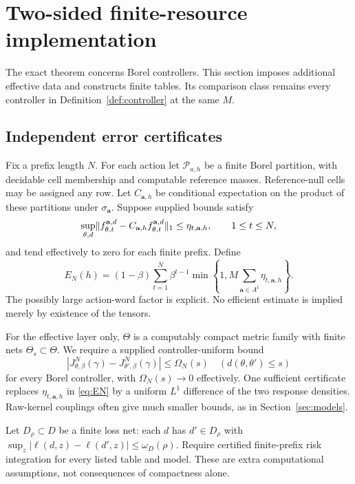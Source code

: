 \section{Two-sided finite-resource implementation}\label{sec:effective}
The exact theorem concerns Borel controllers. This section imposes additional effective data and constructs finite tables. Its comparison class remains every controller in Definition~\ref{def:controller} at the same $M$.

\subsection{Independent error certificates}
Fix a prefix length $N$. For each action let $\mathcal P_{a,h}$ be a finite Borel partition, with decidable cell membership and computable reference masses. Reference-null cells may be assigned any row. Let $C_{\mathbf a,h}$ be conditional expectation on the product of these partitions under $\sigma_{\mathbf a}$. Suppose supplied bounds satisfy
\begin{equation}\label{eq:eta}
 \sup_{\theta,d}\lVert f_{\theta,t}^{\mathbf a,d}
                 -C_{\mathbf a,h}f_{\theta,t}^{\mathbf a,d}\rVert_1
       \le\eta_{t,\mathbf a,h},\qquad 1\le t\le N,
\end{equation}
and tend effectively to zero for each finite prefix. Define
\begin{equation}\label{eq:EN}
 E_N(h)=(1-\beta)\sum_{t=1}^N\beta^{t-1}
       \min\left\{1,M\sum_{\mathbf a\in A^t}\eta_{t,\mathbf a,h}\right\}.
\end{equation}
The possibly large action-word factor is explicit. No efficient estimate is implied merely by existence of the tensors.

For the effective layer only, $\Theta$ is a computably compact metric family with finite nets $\Theta_s\subset\Theta$. We require a supplied controller-uniform bound
\begin{equation}\label{eq:Omega}
 |J_{\theta,\beta}^{N}(\gamma)-J_{\theta',\beta}^{N}(\gamma)|
       \le\Omega_N(s)\quad(d(\theta,\theta')\le s)
\end{equation}
for every Borel controller, with $\Omega_N(s)\to0$ effectively. One sufficient certificate replaces $\eta_{t,\mathbf a,h}$ in \eqref{eq:EN} by a uniform $L^1$ difference of the two response densities. Raw-kernel couplings often give much smaller bounds, as in Section~\ref{sec:models}.

Let $D_\rho\subset D$ be a finite loss net: each $d$ has $d'\in D_\rho$ with $\sup_z|\ell(d,z)-\ell(d',z)|\le\omega_D(\rho)$. Require certified finite-prefix risk integration for every listed table and model. These are extra computational assumptions, not consequences of compactness alone.

